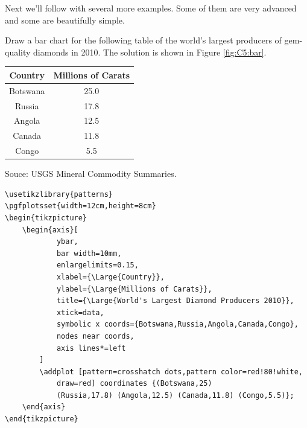 Next we'll follow with several more examples. Some of them are very advanced and some are
beautifully simple.

\begin{example}\label{ex:C5:bar}
Draw a bar chart for the following table of the world's largest producers of gem-quality
diamonds in 2010. The solution is shown in Figure \ref{fig:C5:bar}.
\begin{center}
\renewcommand{\arraystretch}{1.2}
\begin{tabular}{|c|c|} \hline
Country & Millions of Carats \\\hline
Botswana & 25.0 \\\hline
Russia & 17.8 \\\hline
Angola &12.5 \\\hline
Canada & 11.8 \\\hline
Congo & 5.5 \\\hline
\end{tabular}\end{center}
Souce: USGS Mineral Commodity Summaries.

\begin{verbatim}
\usetikzlibrary{patterns}
\pgfplotsset{width=12cm,height=8cm}
\begin{tikzpicture}
    \begin{axis}[
            ybar,
            bar width=10mm,
            enlargelimits=0.15,
            xlabel={\Large{Country}},
            ylabel={\Large{Millions of Carats}},
            title={\Large{World's Largest Diamond Producers 2010}},
            xtick=data,
            symbolic x coords={Botswana,Russia,Angola,Canada,Congo},
            nodes near coords,
            axis lines*=left
        ]
        \addplot [pattern=crosshatch dots,pattern color=red!80!white,
            draw=red] coordinates {(Botswana,25) 
            (Russia,17.8) (Angola,12.5) (Canada,11.8) (Congo,5.5)};
    \end{axis}
\end{tikzpicture}
\end{verbatim}
\end{example}
\usetikzlibrary{patterns}
\pgfplotsset{width=12cm,height=8cm}
